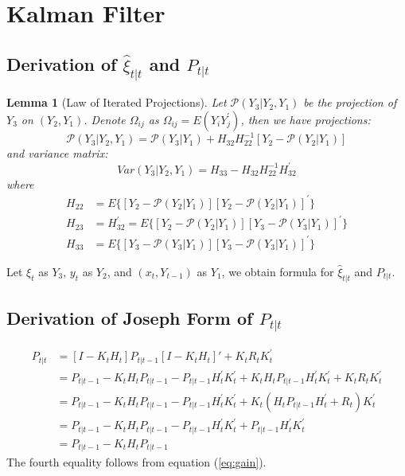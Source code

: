 \documentclass[10pt]{article}
\newtheorem{lemma}{Lemma}
\numberwithin{equation}{section}
\begin{document}
\section{Kalman Filter}
\subsection{Derivation of $\hat{\xi}_{t|t}$ and $P_{t|t}$} \label{ap:iter_proj}
\begin{lemma}[Law of Iterated Projections] \label{lem:1}
    Let $\mathcal{P}(Y_3|Y_2,Y_1)$ be the projection of $Y_3$ on $(Y_2, Y_1)$. Denote $\Omega_{ij}$ as $\Omega_{ij} = E(Y_iY_j^{'})$, then we have projections:
    \[
        \mathcal{P}(Y_3|Y_2,Y_1) = \mathcal{P}(Y_3|Y_1)+H_{32}H_{22}^{-1}[Y_2 - \mathcal{P}(Y_2|Y_1)]
    \]
    and variance matrix:
    \[
        Var(Y_3|Y_2,Y_1) = H_{33} - H_{32}H_{22}^{-1}H_{32}^{'}
    \]
    where 
    \begin{align*}
        H_{22} &= E\{[Y_2-\mathcal{P}(Y_2|Y_1)][Y_2-\mathcal{P}(Y_2|Y_1)]^{'}\} \\
        H_{23} &= H_{32}^{'} = E\{[Y_2-\mathcal{P}(Y_2|Y_1)][Y_3-\mathcal{P}(Y_3|Y_1)]^{'}\} \\
        H_{33} &= E\{[Y_3-\mathcal{P}(Y_3|Y_1)][Y_3-\mathcal{P}(Y_3|Y_1)]^{'}\}
    \end{align*}
\end{lemma}

Let $\xi_t$ as $Y_3$, $y_t$ as $Y_2$, and $(x_t,Y_{t-1})$ as $Y_1$, we obtain formula for $\hat{\xi}_{t|t}$ and $P_{t|t}$.

\subsection{Derivation of Joseph Form of $P_{t|t}$} \label{ap:joseph}
\begin{align*}
    P_{t|t} &= [I - K_tH_t]P_{t|t-1}[I - K_tH_t]' + K_tR_tK_t^{'} \\
    &= P_{t|t-1} - K_tH_tP_{t|t-1} - P_{t|t-1}H_t^{'}K_t^{'} + K_tH_tP_{t|t-1}H_t^{'}K_t^{'} + K_tR_tK_t^{'} \\
    &= P_{t|t-1} - K_tH_tP_{t|t-1} - P_{t|t-1}H_t^{'}K_t^{'} + K_t(H_tP_{t|t-1}H_t^{'} + R_t)K_t^{'} \\
    &= P_{t|t-1} - K_tH_tP_{t|t-1} - P_{t|t-1}H_t^{'}K_t^{'} + P_{t|t-1}H_t^{'}K_t^{'} \\
    &= P_{t|t-1} - K_tH_tP_{t|t-1}
\end{align*}
The fourth equality follows from equation (\ref{eq:gain}).
\end{document}
